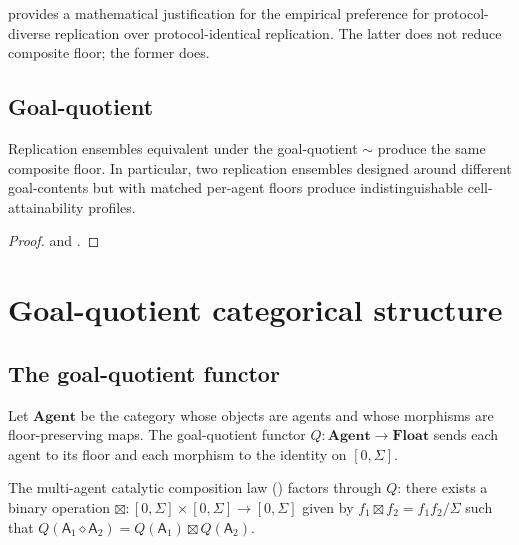 \documentclass[11pt,twocolumn,a4paper]{article}
\newcommand{\agent}{\mathsf{A}}
\newcommand{\Compose}{\diamond}
\begin{document}
\begin{remark}\label{rem:pre-reg}
 provides a mathematical justification for the empirical
preference for protocol-diverse replication over protocol-identical
replication. The latter does not reduce composite floor; the former
does.
\end{remark}

\subsection{Goal-quotient}

\begin{theorem}\label{thm:gq-rep}
Replication ensembles equivalent under the goal-quotient $\sim$ produce
the same composite floor. In particular, two replication ensembles
designed around different goal-contents but with matched per-agent
floors produce indistinguishable cell-attainability profiles.
\end{theorem}

\begin{proof}
 and .
\end{proof}

\section{Goal-quotient categorical structure}
\label{sec:goal-quotient}

\subsection{The goal-quotient functor}

\begin{construction}\label{con:gq-func}
Let $\mathbf{Agent}$ be the category whose objects are agents and whose
morphisms are floor-preserving maps. The goal-quotient functor
$Q:\mathbf{Agent}\to\mathbf{Float}$ sends each agent to its floor and
each morphism to the identity on $[0,\Sigma]$.
\end{construction}

\begin{theorem}
\label{thm:cat-fact}
The multi-agent catalytic composition law ()
factors through $Q$: there exists a binary operation
$\boxtimes:[0,\Sigma]\times[0,\Sigma]\to[0,\Sigma]$ given by
$f_1\boxtimes f_2=f_1f_2/\Sigma$ such that
$Q(\agent_1\Compose\agent_2)=Q(\agent_1)\boxtimes Q(\agent_2)$.
\end{theorem}
\end{document}
